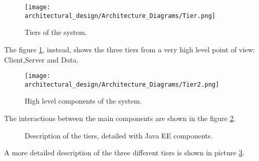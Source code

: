\begin{figure}
	\centering
	\texttt{[image: architectural\_design/Architecture\_Diagrams/Tier.png]}
	\caption{Tiers of the system.}
	\label{fig:tiers}
\end{figure}

The figure \ref{fig:tiers}, instead, shows the three tiers from a very high level point of view: Client,Server and Data.

\begin{figure}
	\centering
	\texttt{[image: architectural\_design/Architecture\_Diagrams/Tier2.png]}
	\caption{High level components of the system.}
	\label{fig:high_components}
\end{figure}

The interactions between the main components are shown in the figure \ref{fig:high_components}.

\begin{figure}
    \vspace*{-2cm}
    \caption{Description of the tiers, detailed with Java EE components.}
	\label{fig:tiers_description}
\end{figure}

A more detailed description of the three different tiers is shown in picture \ref{fig:tiers_description}.


